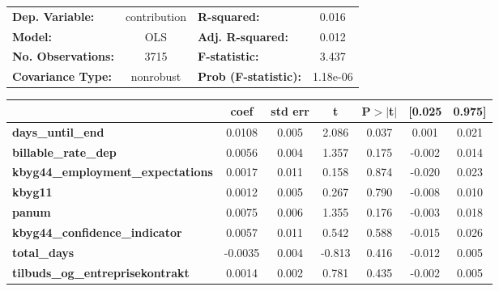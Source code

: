 \begin{center}
\begin{tabular}{lclc}
\toprule
\textbf{Dep. Variable:}                     &  contribution & \textbf{  R-squared:         } &     0.016   \\
\textbf{Model:}                             &      OLS      & \textbf{  Adj. R-squared:    } &     0.012   \\
\textbf{No. Observations:}                  &       3715    & \textbf{  F-statistic:       } &     3.437   \\
\textbf{Covariance Type:}                   &   nonrobust   & \textbf{  Prob (F-statistic):} &  1.18e-06   \\
\bottomrule
\end{tabular}
\begin{tabular}{lcccccc}
                                            & \textbf{coef} & \textbf{std err} & \textbf{t} & \textbf{P$> |$t$|$} & \textbf{[0.025} & \textbf{0.975]}  \\
\midrule
\textbf{days\_until\_end}                   &       0.0108  &        0.005     &     2.086  &         0.037        &        0.001    &        0.021     \\
\textbf{billable\_rate\_dep}                &       0.0056  &        0.004     &     1.357  &         0.175        &       -0.002    &        0.014     \\
\textbf{kbyg44\_employment\_expectations}   &       0.0017  &        0.011     &     0.158  &         0.874        &       -0.020    &        0.023     \\
\textbf{kbyg11}                             &       0.0012  &        0.005     &     0.267  &         0.790        &       -0.008    &        0.010     \\
\textbf{panum}                              &       0.0075  &        0.006     &     1.355  &         0.176        &       -0.003    &        0.018     \\
\textbf{kbyg44\_confidence\_indicator}      &       0.0057  &        0.011     &     0.542  &         0.588        &       -0.015    &        0.026     \\
\textbf{total\_days}                        &      -0.0035  &        0.004     &    -0.813  &         0.416        &       -0.012    &        0.005     \\
\textbf{tilbuds\_og\_entreprisekontrakt}    &       0.0014  &        0.002     &     0.781  &         0.435        &       -0.002    &        0.005     \\

\end{tabular}
\end{center}

